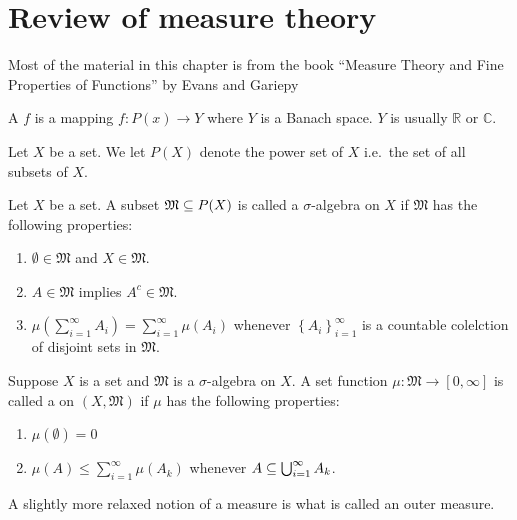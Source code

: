 \chapter{Review of measure theory}

Most of the material in this chapter is from the book ``Measure Theory
and Fine Properties of Functions'' by Evans and Gariepy
\cite{evans1991measure}

\begin{defn}
  A  $f$ is a mapping $f:P(x) \to Y$ where $Y$ is a
  Banach space. $Y$ is usually $\mathbb{R}$ or $\mathbb{C}$.
\end{defn}

\begin{defn}
  Let $X$ be a set. We let $P(X)$ denote the power set of $X$ i.e.\ the
  set of all subsets of $X$.
\end{defn}

\begin{defn}
  Let $X$ be a set. A subset $\mathfrak{M}\subseteq P(X)$ is called a
  $\sigma$-algebra on $X$ if $\mathfrak{M}$ has the following properties:
  \begin{enumerate}
    \item $\emptyset \in \mathfrak{M}$ and $X\in \mathfrak{M}$.
    \item $A\in \mathfrak{M}$ implies $A^c\in \mathfrak{M}$.
    \item $\mu\left( \sum_{i=1}^\infty A_i \right) =
      \sum_{i=1}^\infty\mu(A_i)$ whenever $\left\{ A_i
      \right\}_{i=1}^\infty$ is a countable colelction of disjoint sets
      in $ \mathfrak{M}$.
  \end{enumerate}
\end{defn}

\begin{defn}
  Suppose $X$ is a set and $\mathfrak{M}$ is a $\sigma$-algebra on
  $X$. A set function $\mu: \mathfrak{M} \to [0,\infty]$ is called a
   on $(X, \mathfrak{M})$ if $\mu$ has the following
  properties:
  \begin{enumerate}
    \item $\mu(\emptyset)=0$
    \item  $\mu(A)\le \sum_{i=1}^\infty \mu(A_k)$ whenever $A\subseteq
      \bigcup_{i=1}^\infty A_k$.
  \end{enumerate}
\end{defn}

A slightly more relaxed notion of a measure is what is called an outer measure.

